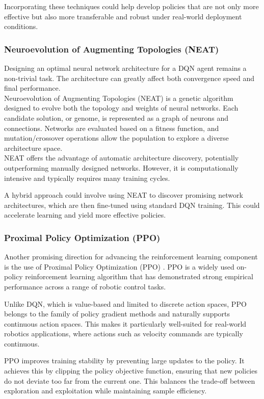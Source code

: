 Incorporating these techniques could help develop policies that are not only more effective but also more transferable and robust under real-world deployment conditions.

\subsubsection{Neuroevolution of Augmenting Topologies (NEAT)}
Designing an optimal neural network architecture for a DQN agent remains a non-trivial task. The architecture can greatly affect both convergence speed and final performance.\\

Neuroevolution of Augmenting Topologies (NEAT) \cite{neat} is a genetic algorithm designed to evolve both the topology and weights of neural networks. Each candidate solution, or genome, is represented as a graph of neurons and connections. Networks are evaluated based on a fitness function, and mutation/crossover operations allow the population to explore a diverse architecture space.\\

NEAT offers the advantage of automatic architecture discovery, potentially outperforming manually designed networks. However, it is computationally intensive and typically requires many training cycles.

A hybrid approach could involve using NEAT to discover promising network architectures, which are then fine-tuned using standard DQN training. This could accelerate learning and yield more effective policies.

\subsubsection{Proximal Policy Optimization (PPO)}
Another promising direction for advancing the reinforcement learning component is the use of Proximal Policy Optimization (PPO) \cite{ppo}. PPO is a widely used on-policy reinforcement learning algorithm that has demonstrated strong empirical performance across a range of robotic control tasks.

Unlike DQN, which is value-based and limited to discrete action spaces, PPO belongs to the family of policy gradient methods and naturally supports continuous action spaces. This makes it particularly well-suited for real-world robotics applications, where actions such as velocity commands are typically continuous.

PPO improves training stability by preventing large updates to the policy. It achieves this by clipping the policy objective function, ensuring that new policies do not deviate too far from the current one. This balances the trade-off between exploration and exploitation while maintaining sample efficiency.

